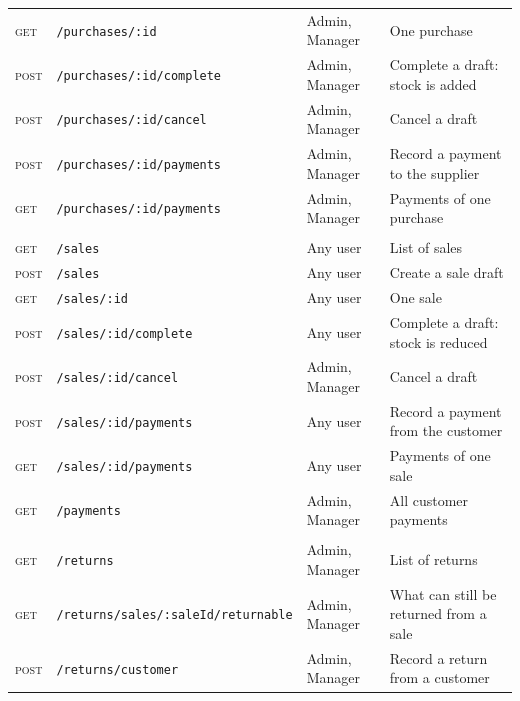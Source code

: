 \documentclass[11pt,a4paper]{article}
\newcommand{\code}[1]{\texttt{#1}}
\begin{document}
\begin{longtable}{@{}P{1.45cm}P{5.1cm}P{2.5cm}P{5.25cm}@{}}
\textsc{get} & \code{/\allowbreak{}purchases/\allowbreak{}:id} & Admin, Manager & One purchase \\
\textsc{post} & \code{/\allowbreak{}purchases/\allowbreak{}:id/\allowbreak{}complete} & Admin, Manager & Complete a draft: stock is added \\
\textsc{post} & \code{/\allowbreak{}purchases/\allowbreak{}:id/\allowbreak{}cancel} & Admin, Manager & Cancel a draft \\
\textsc{post} & \code{/\allowbreak{}purchases/\allowbreak{}:id/\allowbreak{}payments} & Admin, Manager & Record a payment to the supplier \\
\textsc{get} & \code{/\allowbreak{}purchases/\allowbreak{}:id/\allowbreak{}payments} & Admin, Manager & Payments of one purchase \\
\addlinespace
{} \\
\textsc{get} & \code{/\allowbreak{}sales} & Any user & List of sales \\
\textsc{post} & \code{/\allowbreak{}sales} & Any user & Create a sale draft \\
\textsc{get} & \code{/\allowbreak{}sales/\allowbreak{}:id} & Any user & One sale \\
\textsc{post} & \code{/\allowbreak{}sales/\allowbreak{}:id/\allowbreak{}complete} & Any user & Complete a draft: stock is reduced \\
\textsc{post} & \code{/\allowbreak{}sales/\allowbreak{}:id/\allowbreak{}cancel} & Admin, Manager & Cancel a draft \\
\textsc{post} & \code{/\allowbreak{}sales/\allowbreak{}:id/\allowbreak{}payments} & Any user & Record a payment from the customer \\
\textsc{get} & \code{/\allowbreak{}sales/\allowbreak{}:id/\allowbreak{}payments} & Any user & Payments of one sale \\
\textsc{get} & \code{/\allowbreak{}payments} & Admin, Manager & All customer payments \\
\addlinespace
{} \\
\textsc{get} & \code{/\allowbreak{}returns} & Admin, Manager & List of returns \\
\textsc{get} & \code{/\allowbreak{}returns/\allowbreak{}sales/\allowbreak{}:saleId/\allowbreak{}returnable} & Admin, Manager & What can still be returned from a sale \\
\textsc{post} & \code{/\allowbreak{}returns/\allowbreak{}customer} & Admin, Manager & Record a return from a customer \\

\end{longtable}
\end{document}
